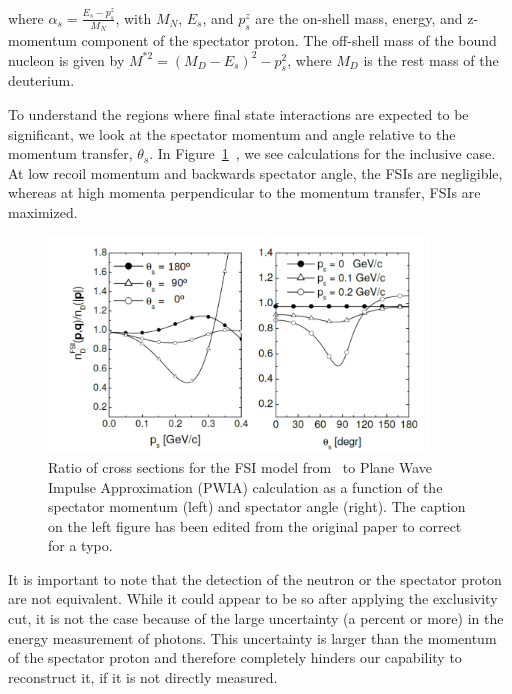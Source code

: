 where $\alpha_s = \frac{E_s - p^{z}_{s}}{M_N}$, with $M_N$, $E_s$, and 
$p^{z}_{s}$ are the on-shell mass, energy, and z-momentum component of the 
spectator proton. The off-shell mass of the bound nucleon is given by $M^{*2} = 
(M_D - E_s)^{2} - p^{2}_{s}$, where $M_D$ is the rest mass of the deuterium.

To understand the regions where final state interactions are expected to be 
significant, we look at the spectator momentum and angle relative to the 
momentum transfer, $\theta_s$.  In 
Figure~\ref{fig:deuteronFSI}~\cite{CiofidegliAtti:2003pb,CiofidegliAtti:2002as}, 
we see calculations for the inclusive case.  At low recoil momentum and 
backwards spectator angle, the FSIs are negligible, whereas at high momenta 
perpendicular to the momentum transfer, FSIs are maximized.

\begin{figure}
   \centering
   \includegraphics[width=0.9\textwidth]{figures/edit_FSI_quasielastic_Atti_2003.pdf}
   \caption{\label{fig:deuteronFSI} Ratio of cross sections for the FSI model 
   from~\cite{CiofidegliAtti:2003pb} to Plane Wave Impulse Approximation (PWIA) 
   calculation as a function of the spectator momentum (left) and spectator 
   angle (right). The caption on the left figure has been edited from the 
   original paper to correct for a typo.}
\end{figure}

It is important to note that the detection of the neutron or the spectator 
proton are not equivalent. While it could appear to be so after applying the 
exclusivity cut, it is not the case because of the large uncertainty (a percent 
or more) in the energy measurement of photons. This uncertainty is larger
than the momentum of the spectator proton and therefore completely hinders our 
capability to reconstruct it, if it is not directly measured.

